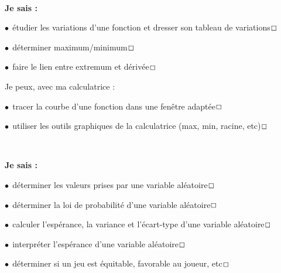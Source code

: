\documentclass[a4paper,11pt]{article}
\begin{document}
\color{titrebleu}\,\hrulefill\,

\begin{casavoir}
\selectfont\small
\textbf{Je sais :}

\tabula{}$\bullet~~$étudier les variations d'une fonction et dresser son tableau de variations\dotfill{}$\Large\Box$

\tabula{}$\bullet~~$déterminer maximum/minimum\dotfill{}$\Large\Box$

\tabula{}$\bullet~~$faire le lien entre extremum et dérivée\dotfill{}$\Large\Box$
\end{casavoir}

\begin{ccalco}
\selectfont\small
Je peux, avec ma calculatrice :

\tabula{}$\bullet~~$tracer la courbe d'une fonction dans une fenêtre adaptée\dotfill{}$\Large\Box$

\tabula{}$\bullet~~$utiliser les outils graphiques de la calculatrice (max, min, racine, etc)\dotfill{}$\Large\Box$
\end{ccalco}

\color{titrebleu}\,\hrulefill\,

\begin{casavoir}
\selectfont\small
\textbf{Je sais :}

\tabula{}$\bullet~~$déterminer les valeurs prises par une variable aléatoire\dotfill{}$\Large\Box$

\tabula{}$\bullet~~$déterminer la loi de probabilité d'une variable aléatoire\dotfill{}$\Large\Box$

\tabula{}$\bullet~~$calculer l'espérance, la variance et l'écart-type d'une variable aléatoire\dotfill{}$\Large\Box$

\tabula{}$\bullet~~$interpréter l'espérance d'une variable aléatoire\dotfill{}$\Large\Box$

\tabula{}$\bullet~~$déterminer si un jeu est équitable, favorable au joueur, etc\dotfill{}$\Large\Box$
\end{casavoir}

\color{titrebleu}\,\hrulefill\,
\end{document}
